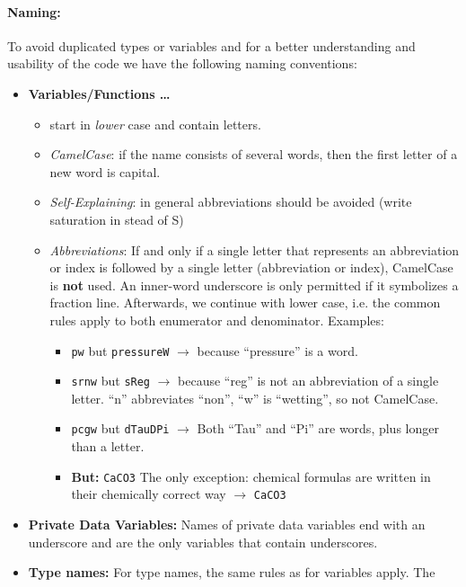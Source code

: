\paragraph{Naming:}
To avoid duplicated types or variables and for a better understanding and usability
of the code we have the following naming conventions:
\begin{itemize}
\item \textbf{Variables/Functions \ldots}
  \begin{itemize}
  \item start in \emph{lower} case and contain letters.
  \item \emph{CamelCase}: if the name consists of  several words, then
        the first letter of a new word is capital.
  \item \emph{Self-Explaining}: in general abbreviations should be avoided (write saturation in stead of S)
  \item \emph{Abbreviations}: If and only if a single letter that represents an
         abbreviation or index is followed by a single letter (abbreviation or index),
         CamelCase is \textbf{not} used. An inner-word underscore is only permitted if
         it symbolizes a fraction line. Afterwards, we continue with lower case, i.e.
         the common rules apply to both enumerator and denominator. Examples:
  \begin{itemize}
      \item \texttt{pw} but \texttt{pressureW} $\rightarrow$ because ``pressure'' is a word.
      \item \texttt{srnw} but \texttt{sReg} $\rightarrow$ because ``reg'' is not an
            abbreviation of a single letter. ``n'' abbreviates ``non'',
             ``w'' is ``wetting'', so not CamelCase.
      \item \texttt{pcgw} but \texttt{dTauDPi} $\rightarrow$ Both ``Tau'' and ``Pi''
            are words, plus longer than a letter.
      \item \textbf{But:} \texttt{CaCO3} The only exception: chemical formulas are
            written in their chemically correct way $\rightarrow$ \texttt{CaCO3}
  \end{itemize}
  \end{itemize}
\item \textbf{Private Data Variables:} Names of private data variables end with an
      underscore and are the only variables that contain underscores.
\item \textbf{Type names:} For type names, the same rules as for variables apply. The

\end{itemize}
